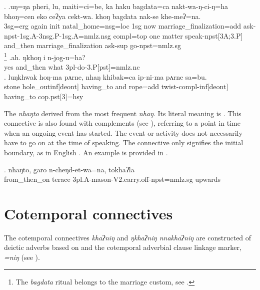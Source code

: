 \ex. \ag.uŋ=ŋa pheri, lu, maiti=ci=be, ka haku bagdata=ca nakt-wa-ŋ-ci-ŋ=ha bhoŋ=cen eko ceʔya cekt-wa. khoŋ bagdata  nak-se khe-meʔ=na.\\
{\sc 3sg=erg} again {\sc init} natal\_home{\sc =nsg=loc} {\sc 1sg} now marriage\_finalization{\sc =add} ask{\sc -npst-1sg.A-3nsg.P-1sg.A=nmlz.nsg} {\sc compl=top} one matter speak{\sc -npst[3A;3.P]} and\_then marriage\_finalization ask{\sc -sup} go{\sc [3]-npst=nmlz.sg}\\
\footnote{The \emph{bagdata} ritual belongs to the  marriage custom, see .} 
\bg.ah.    ŋkhoŋ    i    n-jog-u=ha?\\
yes and\_then what {\sc 3pl-}do{\sc -3.P[pst]=nmlz.nc}\\
 
\bg. luŋkhwak hoŋ-ma                pʌrne, nhaŋ     khibak=ca        ip-ni-ma                       pʌrne    sa=bu.\\
stone hole\_out{\sc inf[deont]} having\_to and rope{\sc =add} twist{\sc -compl-inf[deont]} having\_to {\sc cop.pst[3]=hsy}\\
 


The  \emph{nhaŋto} derived from the most frequent  \emph{nhaŋ}. Its literal meaning is . This connective is also found with complements (see ), referring to a point in time when an ongoing event has started. The event or activity does not necessarily have to go on at the time of speaking. The connective only signifies the initial boundary, as in English . An example is provided in \Next.
 
\exg. nhaŋto, garo    n-cheŋd-et-wa=na,                             tokhaʔla\\
from\_then\_on terace {\sc 3pl.A-}mason{\sc -V2.carry.off-npst=nmlz.sg} upwards\\
 

\section{Cotemporal connectives} 

The cotemporal connectives \emph{khaʔniŋ} and \emph{ŋkhaʔniŋ \ti nnakhaʔniŋ} are constructed of deictic adverbs based on  and the cotemporal adverbial clause linkage marker, \emph{=niŋ} (see \Next).

